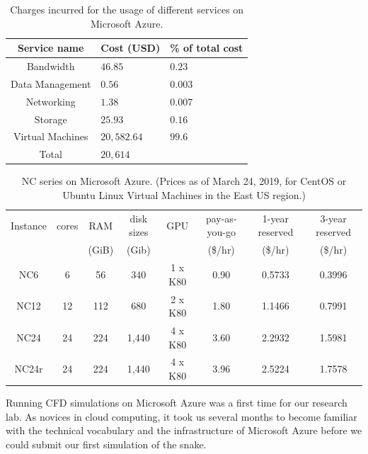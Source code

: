 \documentclass[10pt,journal,compsoc]{IEEEtran}
\begin{document}
\begin{table}
    \renewcommand{\arraystretch}{1.5}
    \caption{Charges incurred for the usage of different services on Microsoft Azure.}
    \label{tab:azure_charges}
    \centering
    \begin{tabular}{cll}
        Service name & Cost (USD) & \% of total cost \\
        \hline
        Bandwidth & $46.85$ & $0.23$ \\
        Data Management & $0.56$ & $0.003$ \\
        Networking & $1.38$ & $0.007$ \\
        Storage & $25.93$ & $0.16$ \\
        Virtual Machines & $20,582.64$& $99.6$ \\
        \hline
        Total & $20,614$ & \\
        \hline
    \end{tabular}
\end{table}

\begin{table}[!h]
    \renewcommand{\arraystretch}{1.5}
    \caption{NC series on Microsoft Azure. (Prices as of March 24, 2019, for CentOS or Ubuntu Linux Virtual Machines in the East US region.)}
    \label{tab:nc_series}
    \centering
    \begin{tabular}{cccccccc}
        Instance & cores & RAM & disk sizes & GPU & pay-as-you-go & 1-year reserved & 3-year reserved \\
        && (GiB) & (Gib) && (\$/hr) & (\$/hr) & (\$/hr) \\
        \hline
        NC6 & 6 & 56 & 340 & 1 x K80 & 0.90 & 0.5733 & 0.3996 \\
        NC12 & 12 & 112 & 680 & 2 x K80 & 1.80 & 1.1466 & 0.7991 \\
        NC24 & 24 & 224 & 1,440 & 4 x K80 & 3.60 & 2.2932 & 1.5981 \\
        NC24r\footnotemark & 24 & 224 & 1,440 & 4 x K80 & 3.96 & 2.5224 & 1.7578 \\
        \hline
    \end{tabular}
\end{table}

Running CFD simulations on Microsoft Azure was a first time for our research lab.
As novices in cloud computing, it took us several months to become familiar with the technical vocabulary and the infrastructure of Microsoft Azure before we could submit our first simulation of the snake.
\end{document}
